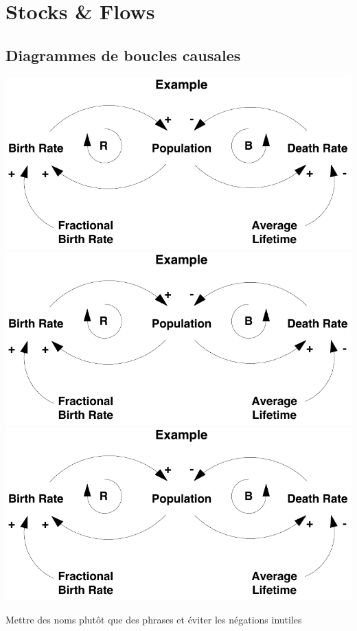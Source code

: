 \documentclass[resume]{subfiles}
\begin{document}
\section{Stocks \& Flows}
\subsection{Diagrammes de boucles causales}
\begin{center}
\includegraphics[scale=0.4,page=1]{img_0.pdf}\\
\includegraphics[scale=0.4,page=2]{img_0.pdf}\\
\includegraphics[scale=0.4,page=3]{img_0.pdf}
\end{center}
Mettre des noms plutôt que des phrases et éviter les négations inutiles
\end{document}
